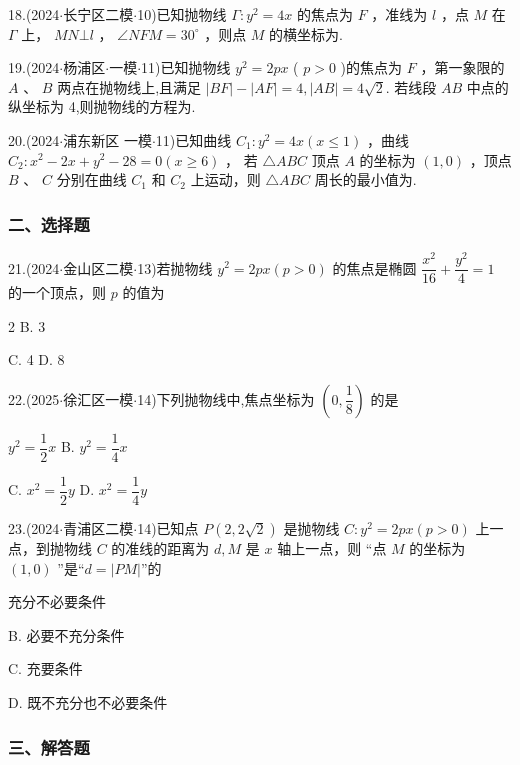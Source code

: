 18.(2024$\cdot$长宁区二模$\cdot$10)已知抛物线 $\Gamma  : {y}^{2} = {4x}$ 的焦点为 $F$ ，准线为 $l$ ，点 $M$ 在 $\Gamma$ 上， ${MN} \bot  l$ ， $\angle {NFM} = {30}^{ \circ  }$ ，则点 $M$ 的横坐标为\blkda[2]{}.

19.(2024$\cdot$杨浦区$\cdot$一模$\cdot$11)已知抛物线 ${y}^{2} = {2px}$ ( $p > 0$ )的焦点为 $F$ ，第一象限的 $A$ 、 $B$ 两点在抛物线上,且满足 $\left| {BF}\right|  - \left| {AF}\right|  = 4,\left| {AB}\right|  = 4\sqrt{2}$. 若线段 ${AB}$ 中点的纵坐标为 4,则抛物线的方程为\blkda[2]{}.

20.(2024$\cdot$浦东新区 一模$\cdot$11)已知曲线 ${C}_{1} : {y}^{2} = {4x}\left( {x \leq  1}\right)$ ，曲线 ${C}_{2} : {x}^{2} - {2x} + {y}^{2} - {28} = 0\left( {x \geq  6}\right)$ ， 若 $\bigtriangleup {ABC}$ 顶点 $A$ 的坐标为 $\left( {1,0}\right)$ ，顶点 $B$ 、 $C$ 分别在曲线 ${C}_{1}$ 和 ${C}_{2}$ 上运动，则 $\bigtriangleup {ABC}$ 周长的最小值为\blkda[2]{}.

\subsubsection*{二、选择题}

21.(2024$\cdot$金山区二模$\cdot$13)若抛物线 ${y}^{2} = {2px}\left( {p > 0}\right)$ 的焦点是椭圆 $\dfrac{{x}^{2}}{16} + \dfrac{{y}^{2}}{4} = 1$ 的一个顶点，则 $p$ 的值为 \dotfill{(\kh{})}

\xx{}{}{}{}2 B. 3

C. 4 D. 8

22.(2025$\cdot$徐汇区一模$\cdot$14)下列抛物线中,焦点坐标为 $\left( {0,\dfrac{1}{8}}\right)$ 的是 \dotfill{(\kh{})}

\xx{}{}{}{}${y}^{2} = \dfrac{1}{2}x$ B. ${y}^{2} = \dfrac{1}{4}x$

C. ${x}^{2} = \dfrac{1}{2}y$ D. ${x}^{2} = \dfrac{1}{4}y$

23.(2024$\cdot$青浦区二模$\cdot$14)已知点 $P\left( {2,2\sqrt{2}}\right)$ 是抛物线 $C : {y}^{2} = {2px}\left( {p > 0}\right)$ 上一点，到抛物线 $C$ 的准线的距离为 $d,M$ 是 $x$ 轴上一点，则 “点 $M$ 的坐标为 $\left( {1,0}\right)$ ”是“$d = \left| {PM}\right|$”的 \dotfill{(\kh{})}

\xx{}{}{}{}充分不必要条件

B. 必要不充分条件

C. 充要条件

D. 既不充分也不必要条件

\subsubsection*{三、解答题}

